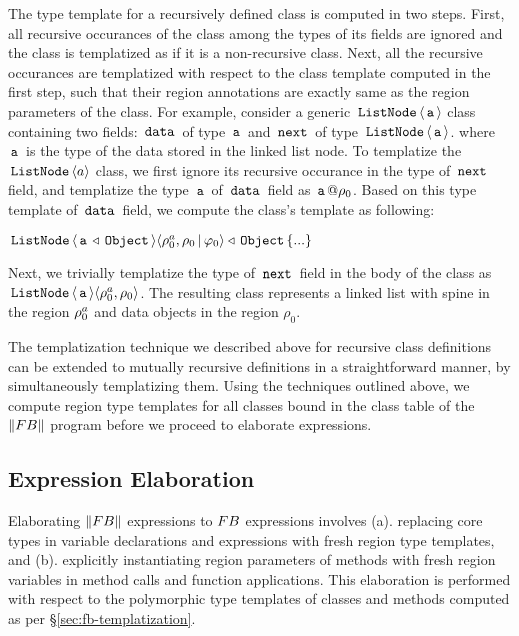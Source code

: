 The type template for a recursively defined class is computed in two
steps. First, all recursive occurances of the class among the types of
its fields are ignored and the class is templatized as if it is a
non-recursive class. Next, all the recursive occurances are
templatized with respect to the class template computed in the first
step, such that their region annotations are exactly same as the
region parameters of the class. For example, consider a generic
$\,{\tt ListNode}\,\langle \,{\tt a}\, \rangle$ class containing two fields: $\,{\tt data}\,$ of
type $\,{\tt a}\,$ and $\,{\tt next}\,$ of type $\,{\tt ListNode}\,\langle \,{\tt a}\, \rangle$.
where $\,{\tt a}\,$ is the type of the data stored in the linked list node.
To templatize the $\,{\tt ListNode}\,\langle a \rangle$ class, we first ignore its
recursive occurance in the type of $\,{\tt next}\,$ field, and templatize
the type $\,{\tt a}\,$ of $\,{\tt data}\,$ field as $\,{\tt a}\,@\rho_0$. Based on this
type template of $\,{\tt data}\,$ field, we compute the class's template as
following:
\begin{center}
$\,{\tt ListNode}\,\langle \,{\tt a}\,\triangleleft\,{\tt Object}\, \rangle
\langle \rho^a_0,\rho_0\,|\,\varphi_0 \rangle \triangleleft \,{\tt Object}\, \{...\}$
\end{center}
Next, we trivially templatize the type of $\,{\tt next}\,$ field in the body
of the class as $\,{\tt ListNode}\,\langle \,{\tt a}\, \rangle\langle \rho^a_0,\rho_0 \rangle$.
The resulting class represents a linked list with spine in the region
$\rho^a_0$ and data objects in the region $\rho_0$.

The templatization technique we described above for recursive class
definitions can be extended to mutually recursive definitions in a
straightforward manner, by simultaneously templatizing them. Using the
techniques outlined above, we compute region type templates for all
classes bound in the class table of the $\left\| {\sc FB} \right\|$ program before
we proceed to elaborate expressions.




\subsection{Expression Elaboration}

Elaborating $\left\| {\sc FB} \right\|$ expressions to ${\sc FB}$ expressions involves
(a). replacing core types in variable declarations and 
expressions with fresh region type templates, and (b). explicitly
instantiating region parameters of methods with fresh region variables
in method calls and function applications. This elaboration is
performed with respect to the polymorphic type templates of classes
and methods computed as per \S\ref{sec:fb-templatization}. 

